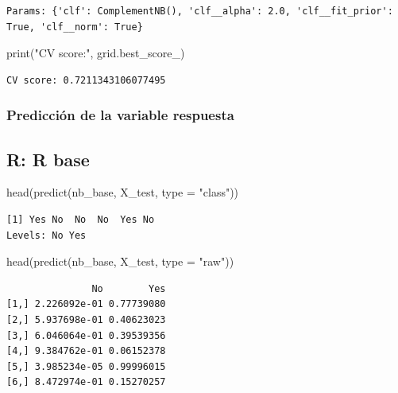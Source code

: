 \documentclass[
  letterpaper,
  DIV=11,
  numbers=noendperiod]{scrartcl}
\newenvironment{Shaded}{\begin{snugshade}}{\end{snugshade}}
\newcommand{\AttributeTok}[1]{\textcolor[rgb]{0.40,0.45,0.13}{#1}}
\newcommand{\BuiltInTok}[1]{\textcolor[rgb]{0.00,0.23,0.31}{#1}}
\newcommand{\FunctionTok}[1]{\textcolor[rgb]{0.28,0.35,0.67}{#1}}
\newcommand{\NormalTok}[1]{\textcolor[rgb]{0.00,0.23,0.31}{#1}}
\newcommand{\StringTok}[1]{\textcolor[rgb]{0.13,0.47,0.30}{#1}}
\begin{document}
\begin{verbatim}
Params: {'clf': ComplementNB(), 'clf__alpha': 2.0, 'clf__fit_prior': True, 'clf__norm': True}
\end{verbatim}

\begin{Shaded}
\begin{Highlighting}[]
\BuiltInTok{print}\NormalTok{(}\StringTok{"CV score:"}\NormalTok{, grid.best\_score\_)}
\end{Highlighting}
\end{Shaded}

\begin{verbatim}
CV score: 0.7211343106077495
\end{verbatim}

\subsubsection{Predicción de la variable
respuesta}\label{predicciuxf3n-de-la-variable-respuesta-2}

\subsection{R: R base}

\begin{Shaded}
\begin{Highlighting}[]
\FunctionTok{head}\NormalTok{(}\FunctionTok{predict}\NormalTok{(nb\_base, X\_test, }\AttributeTok{type =} \StringTok{"class"}\NormalTok{))}
\end{Highlighting}
\end{Shaded}

\begin{verbatim}
[1] Yes No  No  No  Yes No 
Levels: No Yes
\end{verbatim}

\begin{Shaded}
\begin{Highlighting}[]
\FunctionTok{head}\NormalTok{(}\FunctionTok{predict}\NormalTok{(nb\_base, X\_test, }\AttributeTok{type =} \StringTok{"raw"}\NormalTok{))}
\end{Highlighting}
\end{Shaded}

\begin{verbatim}
               No        Yes
[1,] 2.226092e-01 0.77739080
[2,] 5.937698e-01 0.40623023
[3,] 6.046064e-01 0.39539356
[4,] 9.384762e-01 0.06152378
[5,] 3.985234e-05 0.99996015
[6,] 8.472974e-01 0.15270257
\end{verbatim}
\end{document}
